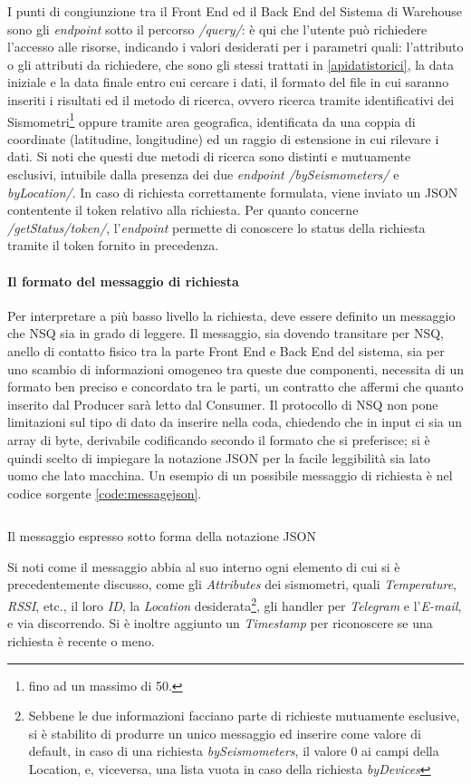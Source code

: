 I punti di congiunzione tra il Front End ed il Back End del Sistema di Warehouse sono gli \textit{endpoint} sotto il percorso \textit{/query/}: è qui che l'utente può richiedere l'accesso alle risorse, indicando i valori desiderati per i parametri quali: l'attributo o gli attributi da richiedere, che sono gli stessi trattati in \ref{apidatistorici}, la data iniziale e la data finale entro cui cercare i dati, il formato del file in cui saranno inseriti i risultati ed il metodo di ricerca, ovvero ricerca tramite identificativi dei Sismometri\footnote{fino ad un massimo di 50.} oppure tramite area geografica, identificata da una coppia di coordinate (latitudine, longitudine) ed un raggio di estensione in cui rilevare i dati. Si noti che questi due metodi di ricerca sono distinti e mutuamente esclusivi, intuibile dalla presenza dei due \textit{endpoint} \textit{/bySeismometers/} e \textit{byLocation/}. In caso di richiesta correttamente formulata, viene inviato un JSON contentente il token relativo alla richiesta. Per quanto concerne \textit{/getStatus/{token}/}, l'\textit{endpoint} permette di conoscere lo status della richiesta tramite il token fornito in precedenza.

\paragraph{Il formato del messaggio di richiesta} \label{messageformat}
Per interpretare a più basso livello la richiesta, deve essere definito un messaggio che NSQ sia in grado di leggere.
Il messaggio, sia dovendo transitare per NSQ, anello di contatto fisico tra la parte Front End e Back End del sistema, sia per uno scambio di informazioni omogeneo tra queste due componenti, necessita di un formato ben preciso e concordato tra le parti, un contratto che affermi che quanto inserito dal Producer sarà letto dal Consumer.
Il protocollo di NSQ non pone limitazioni sul tipo di dato da inserire nella coda, chiedendo che in input ci sia un array di byte, derivabile codificando secondo il formato che si preferisce; si è quindi scelto di impiegare la notazione JSON per la facile leggibilità sia lato uomo che lato macchina. Un esempio di un possibile messaggio di richiesta è nel codice sorgente \ref{code:messagejson}.
\begin{listing}[h!]
\inputminted[baselinestretch=0.8]{json}{sources/message.json}
\caption{Il messaggio espresso sotto forma della notazione JSON}
\label{code:messagejson}
\end{listing}
Si noti come il messaggio abbia al suo interno ogni elemento di cui si è precedentemente discusso, come gli \textit{Attributes} dei sismometri, quali \textit{Temperature}, \textit{RSSI}, etc., il loro \textit{ID}, la \textit{Location} desiderata\footnote{Sebbene le due informazioni facciano parte di richieste mutuamente esclusive, si è stabilito di produrre un unico messaggio ed inserire come valore di default, in caso di una richiesta \textit{bySeismometers}, il valore 0 ai campi della Location, e, viceversa, una lista vuota in caso della richiesta \textit{byDevices}}, gli handler per \textit{Telegram} e l'\textit{E-mail}, e via discorrendo. Si è inoltre aggiunto un \textit{Timestamp} per riconoscere se una richiesta è recente o meno.

